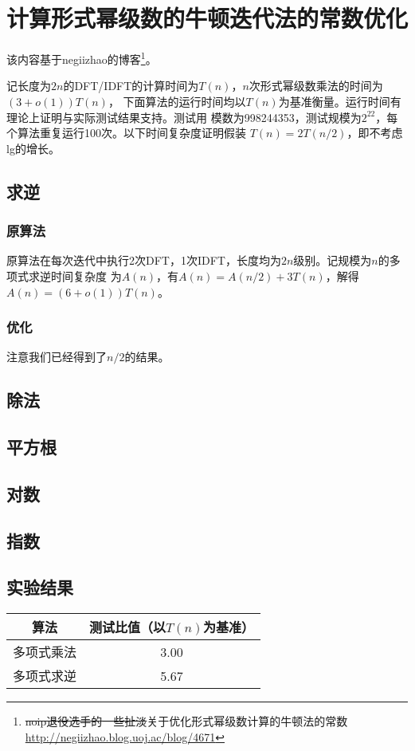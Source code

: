 \section{计算形式幂级数的牛顿迭代法的常数优化}
该内容基于negiizhao的博客\footnote{
    \sout{noip退役选手的一些扯淡}关于优化形式幂级数计算的牛顿法的常数\\
    \url{http://negiizhao.blog.uoj.ac/blog/4671}
}。

记长度为$2n$的DFT/IDFT的计算时间为$T(n)$，$n$次形式幂级数乘法的时间为$(3+o(1))T(n)$，
下面算法的运行时间均以$T(n)$为基准衡量。运行时间有理论上证明与实际测试结果支持。测试用
模数为998244353，测试规模为$2^{22}$，每个算法重复运行100次。以下时间复杂度证明假装
$T(n)=2T(n/2)$，即不考虑lg的增长。
\subsection{求逆}
\subsubsection{原算法}
原算法在每次迭代中执行2次DFT，1次IDFT，长度均为$2n$级别。记规模为$n$的多项式求逆时间复杂度
为$A(n)$，有$A(n)=A(n/2)+3T(n)$，解得$A(n)=(6+o(1))T(n)$。
\subsubsection{优化}
注意我们已经得到了$n/2$的结果。
\subsection{除法}
\subsection{平方根}
\subsection{对数}
\subsection{指数}
\subsection{实验结果}
\begin{tabular}{c|c}
\hline
算法 & 测试比值（以$T(n)$为基准）\\
\hline
多项式乘法 & 3.00\\
多项式求逆 & 5.67\\
\hline
\end{tabular}
